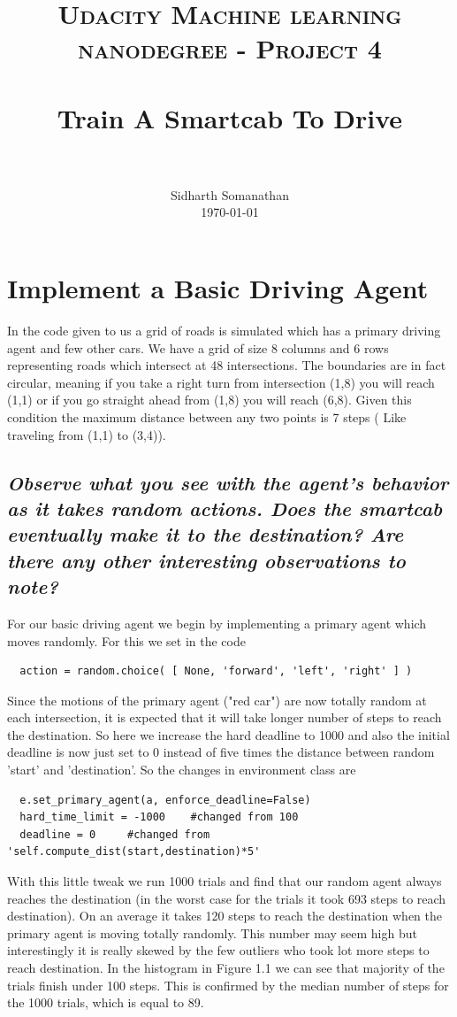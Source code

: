 \documentclass[paper=a4, fontsize=11pt]{scrartcl}
\title{
	\usefont{OT1}{bch}{b}{n}
	\normalfont \normalsize \textsc{  Udacity Machine learning nanodegree - Project 4} \\ [25pt]
	\horrule{0.5pt} \\[0.4cm]
	\huge Train A Smartcab To Drive \\
	\horrule{2pt} \\[0.5cm]
}
\author{
	\normalfont 								\normalsize
	Sidharth Somanathan\\[-3pt]		\normalsize
	\today
}
\date{}
\numberwithin{equation}{section}		%
\numberwithin{figure}{section}			%
\numberwithin{table}{section}				%
\begin{document}
	\maketitle 
	
	\section{Implement a Basic Driving Agent} 
	

In the code given to us a grid of roads is simulated which has a primary driving agent and few other cars. We have a grid of size 8 columns and 6 rows representing roads which intersect at 48 intersections. The boundaries are in fact circular, meaning if you take a right turn from intersection (1,8) you will reach (1,1) or if you go straight ahead from (1,8) you will reach (6,8). Given this condition the maximum distance between any two points is 7 steps ( Like traveling from (1,1) to (3,4)).
	
	\subsection{\textit{Observe what you see with the agent's behavior as it takes random actions. Does the \textbf{smartcab} eventually make it to the destination? Are there any other interesting observations to note?}} 
 
 For our basic driving agent we begin by implementing a primary agent which moves randomly. For this we set in the code  

\begin{lstlisting} 
  action = random.choice( [ None, 'forward', 'left', 'right' ] ) 
\end{lstlisting} 
     
 Since the motions of the primary agent ("red car") are now totally random at each intersection, it is expected that it will take longer number of steps to reach the destination. So here we increase the hard deadline to 1000 and also the initial deadline is now just set to 0 instead of five times the distance between random 'start' and 'destination'.  So the changes in environment class are
 

\begin{lstlisting}        
  e.set_primary_agent(a, enforce_deadline=False) 
  hard_time_limit = -1000    #changed from 100	 
  deadline = 0     #changed from  'self.compute_dist(start,destination)*5'		
\end{lstlisting} 
 
 
 With this little tweak we run 1000 trials and find that our random agent always reaches the destination (in the worst case for the trials it took 693 steps to reach destination). On an average it takes 120 steps to reach the destination when the primary agent is moving totally randomly. This number may seem high but interestingly it is really skewed by the few outliers who took lot more steps to reach destination. In the histogram in Figure 1.1 we can see that majority of the trials finish under 100 steps. This is confirmed by the median number of steps for the 1000 trials, which is equal to 89.   
 
\end{document}
